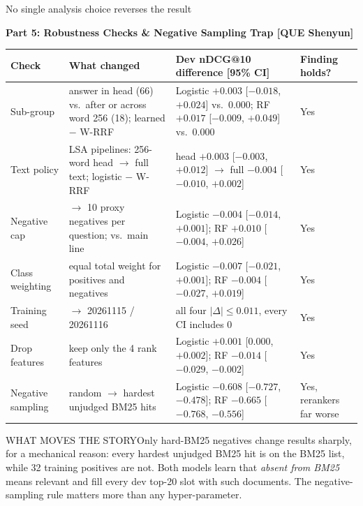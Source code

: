 \documentclass[aspectratio=169,10pt,xcolor=table]{beamer}
\newcommand{\spk}{}
\newcommand{\speakername}{HU Yuyi}
\newcommand{\sect}[1]{{\small\bfseries\color{ink}#1\par}\vspace{2pt}}
\renewcommand{\arraystretch}{1.2}
\begin{document}
\renewcommand{\speakername}{QUE Shenyun (60269510)}
\renewcommand{\spk}{0:40}
\begin{frame}{No single analysis choice reverses the result}
\sect{Part 5: Robustness Checks \& Negative Sampling Trap [QUE Shenyun]}
\begingroup\scriptsize\setlength{\tabcolsep}{3.8pt}\renewcommand{\arraystretch}{0.98}
\begin{tabular}{@{}>{\raggedright\arraybackslash}p{2.1cm}>{\raggedright\arraybackslash}p{3.8cm}%
  >{\raggedright\arraybackslash}p{6.0cm}>{\raggedright\arraybackslash}p{1.9cm}@{}}
\toprule
\textbf{Check} & \textbf{What changed} & \textbf{Dev nDCG@10 difference [95\% CI]} & \textbf{Finding holds?}\\
\midrule
Sub-group & answer in head (66) vs.\ after or across word 256 (18); learned $-$ W-RRF
  & Logistic $+0.003$ [$-0.018$, $+0.024$] vs.\ $0.000$; RF $+0.017$ [$-0.009$, $+0.049$] vs.\ $0.000$ & Yes\\
Text policy & LSA pipelines: 256-word head $\rightarrow$ full text; logistic $-$ W-RRF
  & head $+0.003$ [$-0.003$, $+0.012$] $\rightarrow$ full $-0.004$ [$-0.010$, $+0.002$] & Yes\\
Negative cap & 50 $\rightarrow$ 10 proxy negatives per question; vs.\ main line
  & Logistic $-0.004$ [$-0.014$, $+0.001$]; RF $+0.010$ [$-0.004$, $+0.026$] & Yes\\
Class weighting & equal total weight for positives and negatives
  & Logistic $-0.007$ [$-0.021$, $+0.001$]; RF $-0.004$ [$-0.027$, $+0.019$] & Yes\\
Training seed & 20261114 $\rightarrow$ 20261115 / 20261116
  & all four $|\Delta|\le0.011$, every CI includes 0 & Yes\\
Drop features & keep only the 4 rank features
  & Logistic $+0.001$ [$0.000$, $+0.002$]; RF $-0.014$ [$-0.029$, $-0.002$] & Yes\\
Negative sampling & random $\rightarrow$ hardest unjudged BM25 hits
  & Logistic $-0.608$ [$-0.727$, $-0.478$]; RF $-0.665$ [$-0.768$, $-0.556$] & Yes, rerankers far worse\\
\bottomrule
\end{tabular}\par\endgroup
\vspace{2pt}
\begin{graybox}{WHAT MOVES THE STORY}Only hard-BM25 negatives change results sharply, for a mechanical reason:
  every hardest unjudged BM25 hit is on the BM25 list, while 32 training positives are not. Both models learn
  that \emph{absent from BM25} means relevant and fill every dev top-20 slot with such documents. The
  negative-sampling rule matters more than any hyper-parameter.\end{graybox}
\end{frame}
\end{document}
